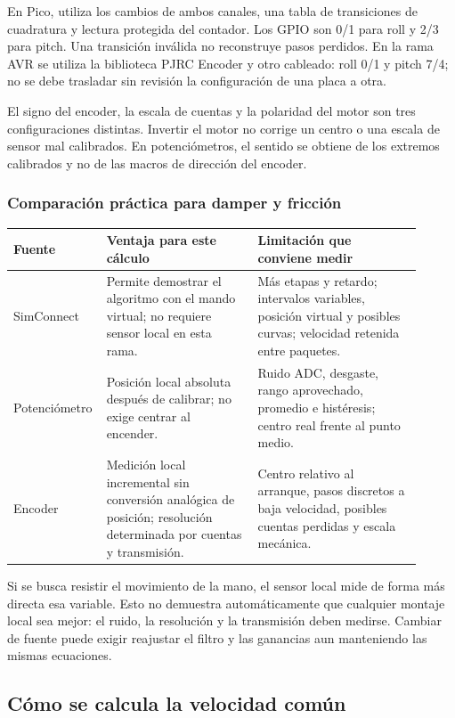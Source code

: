 \documentclass[11pt,a4paper]{article}
\newcommand{\code}[1]{\texttt{\detokenize{#1}}}
\begin{document}
En Pico, \code{PicoEncoder.h} utiliza los cambios de ambos canales, una tabla de transiciones de cuadratura y lectura protegida del contador. Los GPIO son 0/1 para roll y 2/3 para pitch. Una transición inválida no reconstruye pasos perdidos. En la rama AVR se utiliza la biblioteca PJRC Encoder y otro cableado: roll 0/1 y pitch 7/4; no se debe trasladar sin revisión la configuración de una placa a otra.

El signo del encoder, la escala de cuentas y la polaridad del motor son tres configuraciones distintas. Invertir el motor no corrige un centro o una escala de sensor mal calibrados. En potenciómetros, el sentido se obtiene de los extremos calibrados y no de las macros de dirección del encoder.

\subsubsection{Comparación práctica para damper y fricción}
\begin{longtable}{p{0.16\linewidth}p{0.36\linewidth}p{0.39\linewidth}}
\toprule
Fuente & Ventaja para este cálculo & Limitación que conviene medir\\
\midrule
SimConnect & Permite demostrar el algoritmo con el mando virtual; no requiere sensor local en esta rama. & Más etapas y retardo; intervalos variables, posición virtual y posibles curvas; velocidad retenida entre paquetes.\\
Potenciómetro & Posición local absoluta después de calibrar; no exige centrar al encender. & Ruido ADC, desgaste, rango aprovechado, promedio e histéresis; centro real frente al punto medio.\\
Encoder & Medición local incremental sin conversión analógica de posición; resolución determinada por cuentas y transmisión. & Centro relativo al arranque, pasos discretos a baja velocidad, posibles cuentas perdidas y escala mecánica.\\
\bottomrule
\end{longtable}
Si se busca resistir el movimiento de la mano, el sensor local mide de forma más directa esa variable. Esto no demuestra automáticamente que cualquier montaje local sea mejor: el ruido, la resolución y la transmisión deben medirse. Cambiar de fuente puede exigir reajustar el filtro y las ganancias aun manteniendo las mismas ecuaciones.

\subsection{Cómo se calcula la velocidad común}
\label{sec:velocidad_comun}
\end{document}
